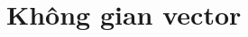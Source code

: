 \documentclass[class=linearalgebra,crop=false]{standalone}
\begin{document}
\chapter{Không gian vector}

\begin{exercise}
\end{exercise}
\end{document}
